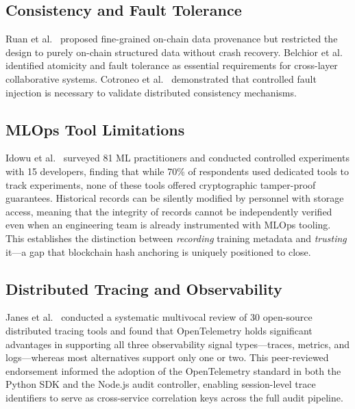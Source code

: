 \documentclass[10pt,twocolumn]{article}
\begin{document}
\subsection{Consistency and Fault Tolerance}

Ruan et al.~\cite{ruan2019} proposed fine-grained on-chain data provenance but restricted
the design to purely on-chain structured data without crash recovery. Belchior et
al.~\cite{belchior2022} identified atomicity and fault tolerance as essential requirements
for cross-layer collaborative systems. Cotroneo et al.~\cite{cotroneo2022} demonstrated
that controlled fault injection is necessary to validate distributed consistency mechanisms.

\subsection{MLOps Tool Limitations}

Idowu et al.~\cite{idowu2024} surveyed 81 ML practitioners and conducted controlled
experiments with 15 developers, finding that while 70\% of respondents used dedicated
tools to track experiments, none of these tools offered cryptographic tamper-proof
guarantees. Historical records can be silently modified by personnel with storage access,
meaning that the integrity of records cannot be independently verified even when an
engineering team is already instrumented with MLOps tooling. This establishes the
distinction between \emph{recording} training metadata and \emph{trusting} it---a gap
that blockchain hash anchoring is uniquely positioned to close.

\subsection{Distributed Tracing and Observability}

Janes et al.~\cite{janes2023} conducted a systematic multivocal review of 30 open-source
distributed tracing tools and found that OpenTelemetry holds significant advantages in
supporting all three observability signal types---traces, metrics, and logs---whereas most
alternatives support only one or two. This peer-reviewed endorsement informed the adoption
of the OpenTelemetry standard in both the Python SDK and the Node.js audit controller,
enabling session-level trace identifiers to serve as cross-service correlation keys across
the full audit pipeline.

\end{document}
